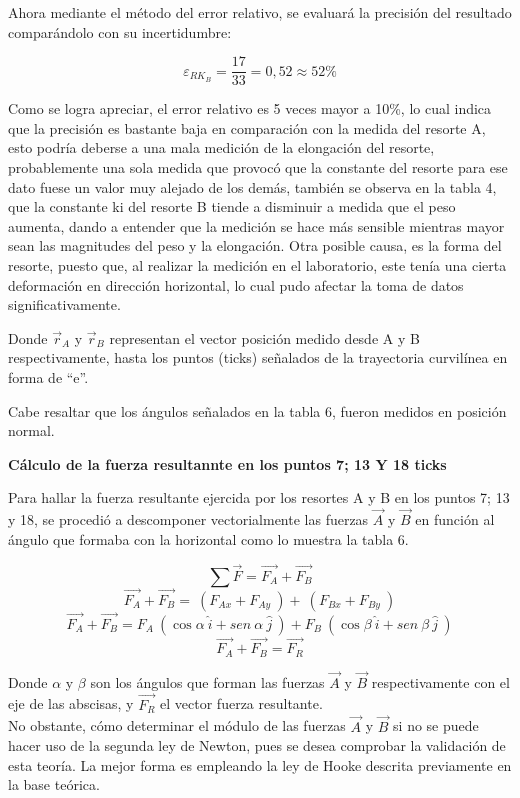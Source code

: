 \documentclass[../main.tex]{subfiles}
\begin{document}
Ahora mediante el método del error relativo, se evaluará la precisión del resultado comparándolo con su incertidumbre:

\[\varepsilon_{RK_B}=\frac{17}{33}=0,52\approx52\%\]

Como se logra apreciar, el error relativo es 5 veces mayor a 10\%,
lo cual indica que la precisión es bastante baja en comparación con la
medida del resorte A, esto podría deberse a una mala medición de la elongación
del resorte, probablemente una sola medida que provocó que la constante del 
resorte para ese dato fuese un valor muy alejado de los demás, también se observa
en la tabla 4, que la constante ki del resorte B tiende a disminuir a medida que 
el peso aumenta, dando a entender que la medición se hace más sensible mientras mayor 
sean las magnitudes del peso y la elongación. Otra posible causa, es la forma del resorte,
puesto que, al realizar la medición en el laboratorio, este tenía una cierta deformación 
en dirección horizontal, lo cual pudo afectar la toma de datos significativamente.


Donde $\vec{r}_A$ y $\vec{r}_B$ representan el vector posición medido desde A y B
respectivamente, hasta los puntos (ticks) señalados de la trayectoria curvilínea en
forma de “e”.


Cabe resaltar que los ángulos señalados en la tabla 6, fueron medidos en posición normal.

\textbf{Cálculo de la fuerza resultannte en los puntos 7; 13 Y 18 ticks}

Para hallar la fuerza resultante ejercida por los resortes A y B en los puntos 7; 13 y 18, 
se procedió a descomponer vectorialmente las fuerzas $\vec{A}$ y $\vec{B}$ en función 
al ángulo que formaba con la horizontal como lo muestra la tabla 6.

\[\sum{\vec{F}}= \vec{F_A} + \vec{F_B}\]
\[\vec{F_A}+\vec{F_B}=\ (F_{Ax}+F_{Ay}\ )+\ (F_{Bx}+F_{By}\ )\]
\[\vec{F_A}+\vec{F_B}=F_A\ (\cos{\alpha}\ \hat{i}+sen\ \alpha\ \hat{j}\ )+F_B\ (\cos{\beta}\ \hat{i}+sen\ \beta\ \hat{j}\ )\]
\[\vec{F_A}+\vec{F_B}=\vec{F_R}\]

Donde $\alpha$ y $\beta$ son los ángulos que forman las fuerzas $\vec{A}$ y $\vec{B}$ 
respectivamente con el eje de las abscisas, y $\vec{F_R}$ el vector fuerza resultante.\\

No obstante, cómo determinar el módulo de las fuerzas $\vec{A}$ y $\vec{B}$ si no se puede hacer 
uso de la segunda ley de Newton, pues se desea comprobar la validación de esta teoría. La mejor
forma es empleando la ley de Hooke descrita previamente en la base teórica.
\end{document}
